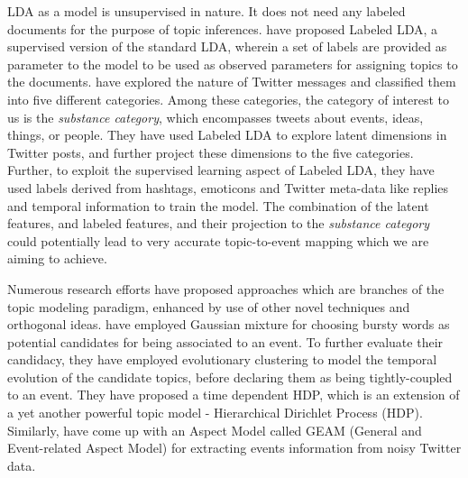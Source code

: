 LDA as a model is unsupervised in nature. It does not need any labeled documents for the purpose of topic inferences. \cite{ramage2009labeled} have proposed Labeled LDA, a supervised version of the standard LDA, wherein a set of labels are provided as parameter to the model to be used as observed parameters for assigning topics to the documents. \cite{ramage2010characterizing} have explored the nature of Twitter messages and classified them into five different categories. Among these categories, the category of interest to us is the \emph{substance category}, which encompasses tweets about events, ideas, things, or people. They have used Labeled LDA to explore latent dimensions in Twitter posts, and further project these dimensions to the five categories. Further, to exploit the supervised learning aspect of Labeled LDA, they have used labels derived from hashtags, emoticons and Twitter meta-data like replies and temporal information to train the model. The combination of the latent features, and labeled features, and their projection to the \emph{substance category} could potentially lead to very accurate topic-to-event mapping which we are aiming to achieve.

Numerous research efforts have proposed approaches which are branches of the topic modeling paradigm, enhanced by use of other novel techniques and orthogonal ideas. \cite{wang2013real} have employed Gaussian mixture for choosing bursty words as potential candidates for being associated to an event. To further evaluate their candidacy, they have employed evolutionary clustering to model the temporal evolution of the candidate topics, before declaring them as being tightly-coupled to an event. They have proposed a time dependent HDP, which is an extension of a yet another powerful topic model - Hierarchical Dirichlet Process (HDP). Similarly, \cite{you2013geam} have come up with an Aspect Model called GEAM (General and Event-related Aspect Model) for extracting events information from noisy Twitter data.
